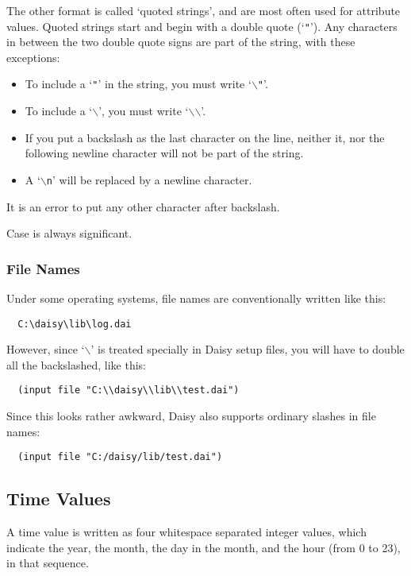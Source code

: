The other format is called `quoted strings', and are most often used
for attribute values.  Quoted strings start and begin with a double
quote (`\texttt{"}').  Any characters in between the two double quote
signs are part of the string, with these exceptions:
\begin{itemize}
\item To include a `\texttt{"}' in the string, you must write
  `\texttt{\mbox{$\backslash$}"}'.
\item To include a `\texttt{\mbox{$\backslash$}}', you must write
  `\texttt{\mbox{$\backslash$}\mbox{$\backslash$}}'.
\item If you put a backslash as the last character on the line,
  neither it, nor the following newline character will not be part of
  the string.
\item A `\texttt{\mbox{$\backslash$}n}' will be replaced by a newline
  character. 
\end{itemize}
It is an error to put any other character after backslash.  

Case is always significant.
\subsubsection{File Names}

Under some operating systems,  file names are conventionally written
like this:
\begin{verbatim}
  C:\daisy\lib\log.dai
\end{verbatim}

However, since `\texttt{\mbox{$\backslash$}}' is treated specially in
Daisy setup files, you will have to double all the backslashed, like
this:
\begin{verbatim}
  (input file "C:\\daisy\\lib\\test.dai")
\end{verbatim}

Since this looks rather awkward, Daisy also supports ordinary slashes
in file names:
\begin{verbatim}
  (input file "C:/daisy/lib/test.dai")
\end{verbatim}

\subsection{Time Values}
\label{type:date}

A time value is written as four whitespace separated integer values,
which indicate the year, the month, the day in the month, and the hour
(from 0 to 23), in that sequence.

